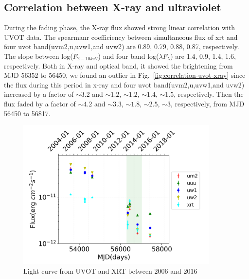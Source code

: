 \documentclass{aastex63}
\begin{document}
\subsection{Correlation between X-ray and ultraviolet}
During the fading phase, the X-ray flux showed strong linear correlation with UVOT data. The spearmanr coefficiency between simultaneous flux of xrt and four uvot band(uvm2,u,uvw1,and uvw2) are 0.89, 0.79, 0.88, 0.87, respectively. The slope  between log($F_{2-10keV}$) and four band log($\lambda F_{\lambda}$) are 1.4, 0.9, 1.4, 1.6, respectively. Both in X-ray and optical band, it showed the brightening from MJD 56352 to 56450, we found an outlier in Fig.~\ref{fig:correlation-uvot-xray} since the flux during this period in x-ray and four uvot  band(uvm2,u,uvw1,and uvw2) increased by a factor of $\sim 3.2$ and $\sim 1.2$, $\sim 1.2$, $\sim 1.4$, $\sim 1.5$, respectively. Then the flux faded by a factor of $\sim 4.2$ and $\sim 3.3$, $\sim 1.8$, $\sim 2.5$, $\sim 3$, respectively, from MJD 56450 to 56817.



\begin{figure}
\centering
	\includegraphics[width=0.9\textwidth]{./pic/uvot-xray-date-lc-sim-left.png}
    \caption{Light curve from UVOT and XRT  between 2006 and 2016}
    \label{fig:uvot-xray-date-lc-all}
\end{figure}
\end{document}
